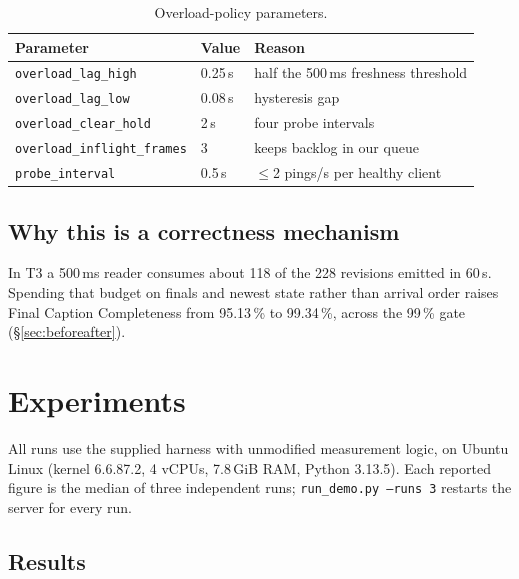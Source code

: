 \documentclass[11pt,a4paper]{article}
\begin{document}
\begin{table}[h]
\centering\small
\begin{tabular}{@{}lll@{}}
\toprule
\textbf{Parameter} & \textbf{Value} & \textbf{Reason} \\
\midrule
\texttt{overload\_lag\_high}        & 0.25\,s & half the 500\,ms freshness threshold \\
\texttt{overload\_lag\_low}         & 0.08\,s & hysteresis gap \\
\texttt{overload\_clear\_hold}      & 2\,s    & four probe intervals \\
\texttt{overload\_inflight\_frames} & 3       & keeps backlog in our queue \\
\texttt{probe\_interval}            & 0.5\,s  & $\le$2 pings/s per healthy client \\
\bottomrule
\end{tabular}
\caption{Overload-policy parameters.}
\end{table}


\subsection{Why this is a correctness mechanism}

In T3 a 500\,ms reader consumes about 118 of the 228 revisions emitted in
60\,s. Spending that budget on finals and newest state rather than arrival
order raises Final Caption Completeness from 95.13\,\% to 99.34\,\%, across
the 99\,\% gate (\S\ref{sec:beforeafter}).




\section{Experiments}

All runs use the supplied harness with unmodified measurement logic, on
Ubuntu Linux (kernel 6.6.87.2, 4 vCPUs, 7.8\,GiB RAM, Python 3.13.5).
Each reported figure is the
median of three independent runs; \texttt{run\_demo.py --runs 3}
restarts the server for every run.

\subsection{Results}
\end{document}
